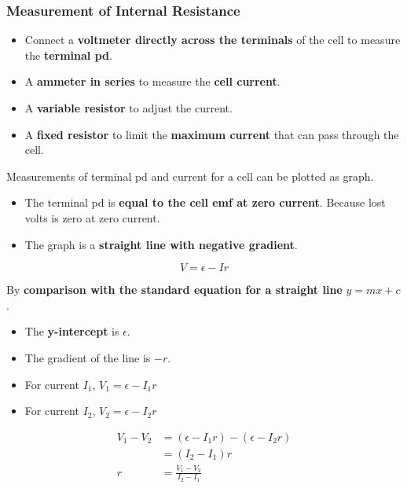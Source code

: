 \subsubsection*{Measurement of Internal Resistance}

\begin{itemize}
    \item Connect a \textbf{voltmeter directly across the terminals} of the cell to measure the \textbf{terminal pd}.
    \item A \textbf{ammeter in series} to measure the \textbf{cell current}.
    \item A \textbf{variable resistor} to adjust the current.
    \item A \textbf{fixed resistor} to limit the \textbf{maximum current} that can pass through the cell.
\end{itemize}

Measurements of terminal pd and current for a cell can be plotted as graph.
\begin{itemize}
    \item The terminal pd is \textbf{equal to the cell emf at zero current}. Because lost volts is zero at zero current.
    \item The graph is a \textbf{straight line with negative gradient}.
\end{itemize}
$$V=\epsilon-Ir$$

By \textbf{comparison with the standard equation for a straight line} $y=mx+c$.
\begin{itemize}
    \item The \textbf{y-intercept} is $\epsilon$.
    \item The gradient of the line is $-r$.
\end{itemize}

\begin{itemize}
    \item For current $I_1$, $V_1=\epsilon-I_1r$
    \item For current $I_2$, $V_2=\epsilon-I_2r$
\end{itemize}

\begin{align*}
    V_1-V_2&=(\epsilon-I_1r)-(\epsilon-I_2r)\\
           &=(I_2-I_1)r\\
    r&=\frac{V_1-V_2}{I_2-I_1}
\end{align*}
